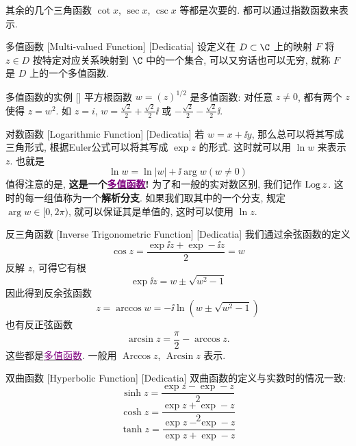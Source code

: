 \documentclass[UTF8]{ctexart}
\newcommand{\hyperrefc}[2]{\hyperref[#1]{\textcolor{purple}{#2}}}
\begin{document}
        其余的几个三角函数 \(\cot x\),  \(\sec x\),  \(\csc x\) 等都是次要的. 都可以通过指数函数来表示. 

        \begin{dfn}
            [Multivalued]
            {多值函数}
            [Multi-valued Function]
            [Dedicatia]
            设定义在 \(D\subset\C\) 上的映射 \(F\) 将 \(z\in D\) 按特定对应关系映射到 \(\C\) 中的一个集合, 可以又穷话也可以无穷, 就称 \(F\) 是 \(D\) 上的一个多值函数. 
        \end{dfn}

        \begin{xmp}
            {多值函数的实例}
            []
            平方根函数 \(w=(z)^{1/2}\) 是多值函数: 对任意 \(z\neq 0\), 都有两个 \(z\) 使得 \(z=w^2\). 如 \(z=i\),  \(w=\frac{\sqrt{2}}{2}+\frac{\sqrt{2}}{2}\ii\) 或 \(-\frac{\sqrt{2}}{2}-\frac{\sqrt{2}}{2}\ii\).
        \end{xmp}

        \begin{dfn}
            [Logarithmic]
            {对数函数}
            [Logarithmic Function]
            [Dedicatia]
            若 \(w=x+\ii y\), 那么总可以将其写成三角形式, 根据Euler公式可以将其写成 \(\exp z\) 的形式. 这时就可以用 \(\ln w\) 来表示 \(z\). 也就是
            \[\ln w=\ln|w|+\ii\arg w (w\neq 0)\]
            值得注意的是, \textbf{这是一个\hyperrefc{dfn:Multivalued}{多值函数}! }为了和一般的实对数区别, 我们记作 \(\operatorname{Log} z\). 这时的每一组值称为一个\textbf{解析分支}. 如果我们取其中的一个分支, 规定 \(\arg w\in[0,2\pi)\), 就可以保证其是单值的, 这时可以使用 \(\ln z\).
        \end{dfn}

        \begin{dfn}
            [InverseTriangular]
            {反三角函数}
            [Inverse Trigonometric Function]
            [Dedicatia]
            我们通过余弦函数的定义
            \[\cos z=\frac{\exp\ii z+\exp -\ii z}{2}=w\]
            反解 \(z\), 可得它有根
            \[\exp\ii z=w\pm\sqrt{w^2-1}\]
            因此得到反余弦函数
            \[z=\arccos w=-\ii\ln(w\pm\sqrt{w^2-1})\]
            也有反正弦函数
            \[\arcsin z=\frac{\pi}{2}-\arccos z.\]
            这些都是\hyperrefc{dfn:Multivalued}{多值函数}. 一般用 \(\operatorname{Arccos}z\),  \(\operatorname{Arcsin}z\) 表示. \\
        \end{dfn}

        \begin{dfn}
            [HyperbolicFunction]
            {双曲函数}
            [Hyperbolic Function]
            [Dedicatia]
            双曲函数的定义与实数时的情况一致: 
            \[\sinh z=\frac{\exp z-\exp -z}{2}\]
            \[\cosh z=\frac{\exp z+\exp -z}{2}\]
            \[\tanh z=\frac{\exp z-\exp -z}{\exp z+\exp -z}\]
        \end{dfn}
\end{document}
